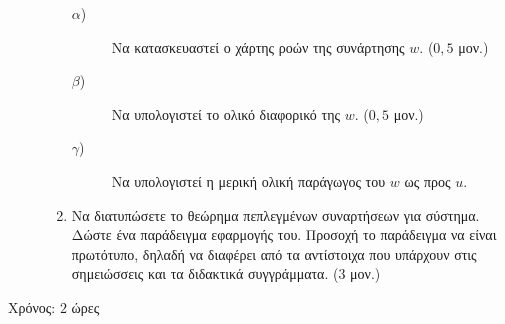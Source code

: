 \documentclass[a4paper,12pt]{article}
\begin{document}
\begin{description}
\begin{enumerate}
\begin{description}
\item [$\alpha$)] Να κατασκευαστεί ο χάρτης ροών της συνάρτησης $w$. ($0,5$ μον.)
\item [$\beta$)] Να υπολογιστεί το ολικό διαφορικό της $w$. ($0,5$ μον.)
\item [$\gamma$)] Να υπολογιστεί η μερική ολική παράγωγος του $w$ ως προς $u$.
\end{description}

\item Να διατυπώσετε το θεώρημα πεπλεγμένων συναρτήσεων για σύστημα. Δώστε ένα παράδειγμα εφαρμογής του. Προσοχή το παράδειγμα να είναι πρωτότυπο, δηλαδή να διαφέρει από τα αντίστοιχα που υπάρχουν στις σημειώσσεις και τα διδακτικά συγγράμματα. ($3$ μον.)

\end{enumerate}
\end{description}
\hfill Χρόνος: $2$ ώρες
\end{document}
